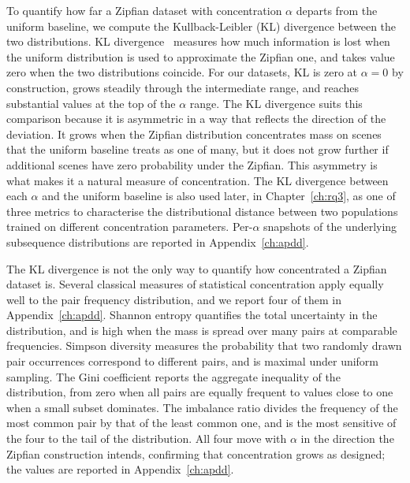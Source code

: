 To quantify how far a Zipfian dataset with concentration $\alpha$ departs from the uniform baseline, we compute the Kullback-Leibler (KL) divergence between the two distributions. KL divergence~\cite{cover_elements_2006} measures how much information is lost when the uniform distribution is used to approximate the Zipfian one, and takes value zero when the two distributions coincide. For our datasets, KL is zero at $\alpha = 0$ by construction, grows steadily through the intermediate range, and reaches substantial values at the top of the $\alpha$ range. The KL divergence suits this comparison because it is asymmetric in a way that reflects the direction of the deviation. It grows when the Zipfian distribution concentrates mass on scenes that the uniform baseline treats as one of many, but it does not grow further if additional scenes have zero probability under the Zipfian. This asymmetry is what makes it a natural measure of concentration. The KL divergence between each $\alpha$ and the uniform baseline is also used later, in Chapter~\ref{ch:rq3}, as one of three metrics to characterise the distributional distance between two populations trained on different concentration parameters. Per-$\alpha$ snapshots of the underlying subsequence distributions are reported in Appendix~\ref{ch:apdd}.

The KL divergence is not the only way to quantify how concentrated a Zipfian dataset is. Several classical measures of statistical concentration apply equally well to the pair frequency distribution, and we report four of them in Appendix~\ref{ch:apdd}. Shannon entropy quantifies the total uncertainty in the distribution, and is high when the mass is spread over many pairs at comparable frequencies. Simpson diversity measures the probability that two randomly drawn pair occurrences correspond to different pairs, and is maximal under uniform sampling. The Gini coefficient reports the aggregate inequality of the distribution, from zero when all pairs are equally frequent to values close to one when a small subset dominates. The imbalance ratio divides the frequency of the most common pair by that of the least common one, and is the most sensitive of the four to the tail of the distribution. All four move with $\alpha$ in the direction the Zipfian construction intends, confirming that concentration grows as designed; the values are reported in Appendix~\ref{ch:apdd}.

